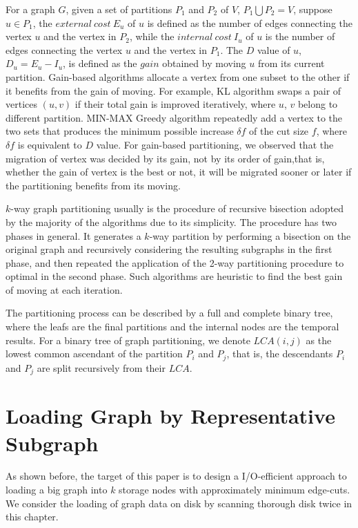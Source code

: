 \documentclass{sig-alternate-2013}
\begin{document}
For a graph $G$, given a set of partitions $P_1$ and $P_2$ of $V$, $P_1 {\bigcup} P_2 = V$, suppose $u\in P_1$, the $external\ cost\ E_u$  of $u$ is defined as the number of edges connecting the vertex $u$ and the vertex in $P_2$, while the $internal\ cost\ I_u$ of $u$ is the number of edges connecting the vertex $u$ and the vertex in $P_1$.
The $D$ value of $u$, $D_u = E_u-I_u$, is defined as the $gain$ obtained by moving $u$ from its current partition. Gain-based algorithms allocate a vertex from one subset to the other if it benefits from the gain of moving. For example, KL algorithm swaps a pair of vertices $(u, v)$ if their total gain is improved iteratively, where $u$, $v$ belong to different partition. MIN-MAX Greedy algorithm repeatedly add a vertex to the two sets that produces the minimum possible increase $\delta f$ of the cut size $f$, where $\delta f$ is equivalent to $D$ value. For gain-based partitioning, we observed that the migration of vertex was decided by its gain, not by its order of gain,that is, whether the gain of vertex is the best or not, it will be migrated sooner or later if the partitioning benefits from its moving.

$k$-way graph partitioning usually is the procedure of recursive bisection adopted by the majority of the algorithms due to its simplicity. The procedure has two phases in general. It generates a $k$-way partition by performing a bisection on the original graph and recursively considering the resulting subgraphs in the first phase,  and then repeated the application of the 2-way partitioning procedure to optimal in the second phase.  Such algorithms are heuristic to find the best gain of moving at each iteration.

The partitioning process can be described by a full and complete binary tree, where the leafs are the final partitions and the internal nodes are the temporal results. For a binary tree of graph partitioning, we denote $LCA(i, j)$ as the lowest common ascendant of  the partition $P_i$ and $P_j$, that is, the descendants $P_i$ and $P_j$ are split recursively from their $LCA$.


\section{ Loading Graph by Representative Subgraph }

As shown before, the target of this paper is to design a I/O-efficient approach to loading a big graph into $k$ storage nodes with approximately minimum edge-cuts. We consider the loading of graph data on disk by scanning thorough disk twice in this chapter.
\end{document}
